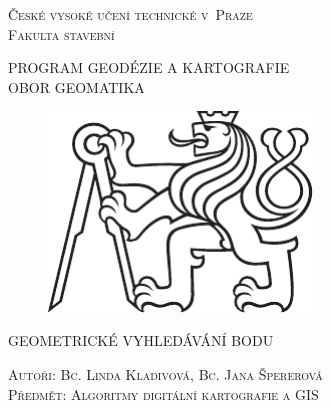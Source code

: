 \documentclass[a4paper,11pt,twoside]{article}
\def\author{Autoři: Bc. Linda Kladivová, Bc. Jana Špererová}
\def\nazevprace{GEOMETRICKÉ VYHLEDÁVÁNÍ BODU}
\begin{document}
\setcounter{page}{1}  %
\sloppy
\setlength{\parskip}{1pt}



\pagestyle{empty} %

\begin{center}
\renewcommand{\baselinestretch}{1.35} %

\LARGE
\textsc{České vysoké učení technické v~Praze} \\
\textsc{Fakulta stavební} \\

\bigskip

\large
\textsc{PROGRAM GEODÉZIE A KARTOGRAFIE} \\
\textsc{OBOR GEOMATIKA} \\

\vspace{10ex}

\begin{figure}[hbt!] %
\begin{center}
\includegraphics[width=7cm]{pictures/symbol_cvut_konturova_verze_cb.pdf} 
\end{center}
\end{figure}

\vspace{20ex}

\large
\textsc{\nazevprace} \\
\smallskip


\vspace{6ex}

\normalsize
\textsc{\author} \\
\bigskip
\normalsize
\textsc{Předmět: Algoritmy digitální kartografie a GIS} \\

\end{center}
\end{document}
